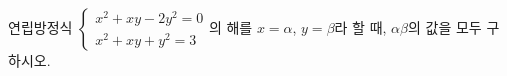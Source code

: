 연립방정식 $\begin{cases} x^2+xy-2y^2=0 \\ x^2+xy+y^2=3 \end{cases}$의 해를 $x=\alpha$, $y=\beta$라 할 때, $\alpha\beta$의 값을 모두 구하시오.

